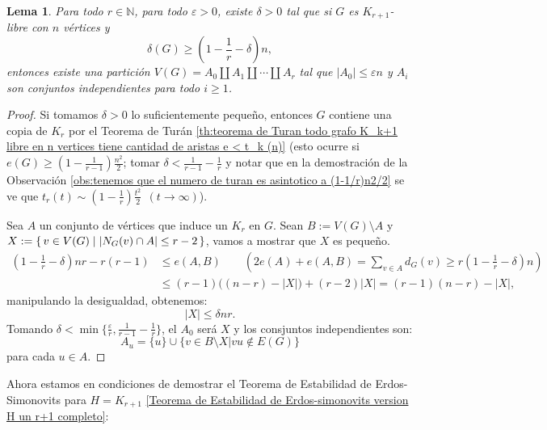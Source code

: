\documentclass[12pt]{report}
\theoremstyle{plain}
\newtheorem{lemma}[theorem]{Lema}
\theoremstyle{definition}
\newcommand{\naturals}{\mathbb{N}}
\newcommand{\abs}[1]{\left \vert #1 \right \vert}
\begin{document}
\begin{lemma}\label{lemma: Teorema de Estabilidad de Erdos-simonovits - lema 2}
Para todo $r \in \naturals$, para todo $\varepsilon > 0$, existe $\delta > 0$ tal que si $G$ es $K_{r+1}$-libre con $n$ vértices y
\[
    \delta (G) \geq \left ( 1 - \frac 1 r - \delta \right) n,
\]
entonces existe una partición $V(G) = A_0 \coprod A_1 \coprod \cdots \coprod A_r$ tal que $\abs {A_0} \leq \varepsilon n$ y $A_i$ son conjuntos independientes para todo $i \geq 1$.
\end{lemma}
\begin{proof}
Si tomamos $\delta >0$ lo suficientemente pequeño, entonces $G$ contiene una copia de $K_r$ por el Teorema de Turán \ref{th:teorema de Turan todo grafo K_k+1 libre en n vertices tiene cantidad de aristas e < t_k (n)} (esto ocurre si $e(G) \geq \left ( 1 - \frac 1 {r-1} \right)\frac{n^2}{2}$; tomar $\delta < \frac 1 {r-1} - \frac 1 r$ y notar que en la demostración de la Observación \ref{obs:tenemos que el numero de turan es asintotico a (1-1/r)n2/2} se ve que $t_r (t) \sim  \left ( 1 - \frac 1 r \right) \frac{t^2}{2} \:\: (t \to \infty)$).

Sea $A$ un conjunto de vértices que induce un $K_r$ en $G$. Sean $B := V(G) \setminus A$ y $X := \set{v \in V(G) | \abs{N_G (v) \cap A} \leq r -2}$, vamos a mostrar que $X$ es pequeño.
\begin{align*}
\left ( 1 - \frac 1 r - \delta \right ) n r - r (r-1) &\leq e(A, B) \quad \quad \left ( 2 e(A) + e(A,B) = \sum_{v \in A} d_G (v) \geq r \left (1 - \frac 1 r - \delta \right )n \right )\\
                &\leq (r-1) \big ((n-r) -\abs X \big) + (r-2) \abs X  = (r-1) (n-r) - \abs X,
\end{align*}
manipulando la desigualdad, obtenemos:
\[
    \abs X \leq \delta n r.
\]
Tomando $\delta < \min \{\frac{\varepsilon}{r}, \frac 1{r-1} - \frac 1 r\}$, el $A_0$ será $X$ y los consjuntos independientes son:
\[
    A_u = \{u\} \cup \{v \in B \setminus X | vu \not \in E(G)\}
\]
para cada $u \in A$.
\end{proof}

Ahora estamos en condiciones de demostrar el Teorema de Estabilidad de Erdos-Simonovits para $H = K_{r+1}$ \ref{Teorema de Estabilidad de Erdos-simonovits version H un r+1 completo}:
\end{document}
